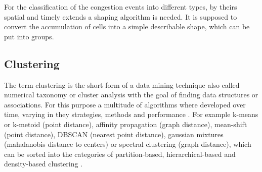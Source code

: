 \documentclass[a4paper,12pt]{report}
\begin{document}
For the classification of the congestion events into different types, by theirs spatial and timely extends a shaping algorithm is needed. It is supposed to convert the accumulation of cells into a simple describable shape, which can be put into groups.

\subsection{Clustering}
\label{methodology_clustering}
The term clustering is the short form of a data mining technique also called numerical taxonomy or cluster analysis with the goal of finding data structures or associations. For this purpose a multitude of algorithms where developed over time, varying in they strategies, methods and performance \cite{Busch2004}. For example k-means or k-metoid (point distance), affinity propagation (graph distance), mean-shift (point distance), DBSCAN (nearest point distance), gaussian mixtures (mahalanobis distance to centers) or spectral clustering (graph distance), which can be sorted into the categories of partition-based, hierarchical-based and density-based clustering \cite{Chauhan2020,Yildirim2020}.

\end{document}
